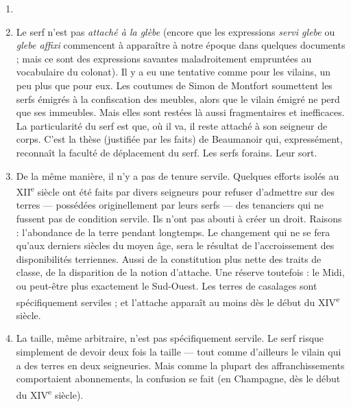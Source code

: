 \documentclass[french,twoside]{book} %
\begin{document}
\begin{enumerate}[itemsep=0pt,]
\item[] \hspace{-1.5em}{\bfseries Mais d’abord équivoques à prévenir :}
\item Le serf n’est pas \emph{attaché à la glèbe} (encore que les expressions \emph{servi glebe} ou \emph{glebe affixi} commencent à apparaître à notre époque dans quelques documents ; mais ce sont des expressions savantes maladroitement empruntées au vocabulaire du colonat). Il y a eu une tentative comme pour les vilains, un peu plus que pour eux. Les coutumes de Simon de Montfort soumettent les serfs émigrés à la confiscation des meubles, alors que le vilain émigré ne perd que ses immeubles. Mais elles sont restées là aussi fragmentaires et inefficaces. La particularité du serf est que, où il va, il reste attaché à son seigneur de corps. C’est la thèse (justifiée par les faits) de Beaumanoir qui, expressément, reconnaît la faculté de déplacement du serf. Les serfs forains. Leur sort.
\item De la même manière, il n’y a pas de tenure servile. Quelques efforts isolés au XII\textsuperscript{e} siècle ont été faits par divers seigneurs pour refuser d’admettre sur des terres — possédées originellement par leurs serfs — des tenanciers qui ne fussent pas de condition servile. Ils n’ont pas abouti à créer un droit. Raisons : l’abondance de la terre pendant longtemps. Le changement qui ne se fera qu’aux derniers siècles du moyen âge, sera le résultat de l’accroissement des disponibilités terriennes. Aussi de la constitution plus nette des traits de classe, de la disparition de la notion d’attache. Une réserve toutefois : le Midi, ou peut-être plus exactement le Sud-Ouest. Les terres de casalages sont spécifiquement serviles ; et l’attache apparaît au moins dès le début du XIV\textsuperscript{e} siècle.
\item La taille, même arbitraire, n’est pas spécifiquement servile. Le serf risque simplement de devoir deux fois la taille — tout comme d’ailleurs le vilain qui a des terres en deux seigneuries. Mais comme la plupart des affranchissements comportaient abonnements, la confusion se fait (en Champagne, dès le début du XIV\textsuperscript{e} siècle).

\end{enumerate} 
\label{p60}
\end{document}
